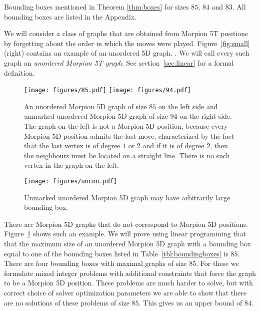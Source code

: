 \begin{table}[ht]
\centering
 

\caption{Bounding boxes mentioned in Theorem \ref{thm:boxes} for sizes $85$, $84$ and $83$. All bounding boxes are listed in the Appendix. }
\label{tbl:boundingboxes}
\end{table}

We will consider a class of graphs that are obtained from Morpion 5T positions by forgetting about 
  the order in which the moves were played. 
Figure~\ref{fig:small} (right) contains an example of an unordered 5D graph. .
We will call every such graph an \emph{unordered Morpion 5T graph}. See section~\ref{sec:linear} for a formal definition.

\begin{figure}[h]
    \texttt{[image: figures/85.pdf]}
    \texttt{[image: figures/94.pdf]}
    \caption{\label{fig:85}
      An unordered Morpion 5D graph of size $85$ on the left side
        and unmarked unordered Morpion 5D graph of size $94$ on the right side. The graph on the left is not a Morpion 5D position, 
because every Morpion 5D position admits the last move, characterized by the fact that the last vertex is of degree $1$ or $2$ and if it is
of degree $2$, then the neighbours must be located on a straight line. There is no such vertex in the graph on the left.
    }
\end{figure}

\begin{figure}
  \centering
  \texttt{[image: figures/uncon.pdf]}
  \caption{
    Unmarked unordered Morpion 5D graph may have arbitrarily large bounding box.
  }
  \label{fig:uncon}
\end{figure}

There are Morpion 5D graphs that do not correspond to Morpion 5D positions.
Figure~\ref{fig:85} shows such an example. 
We will prove using linear programming that that the maximum size of  an unordered Morpion 5D graph with 
  a bounding box equal to one of the bounding boxes listed in Table~\ref{tbl:boundingboxes}
  is $85$. 
There are four bounding boxes with maximal graphs of size $85$. 
For these we formulate mixed integer problems with additional constraints that force the graph to
  be a Morpion 5D position.
These problems are much harder to solve, but with correct choice of solver optimization parameters we are able to show
  that there are no solutions of these problems of size $85$.
This gives us an upper bound of $84$. 

